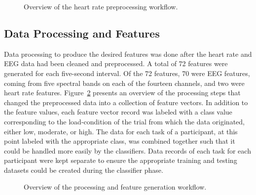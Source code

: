 \documentclass[11pt]{article}
\begin{document}
		\begin{figure}
		\centering
		\caption{Overview of the heart rate preprocessing workflow.}
		\label{fig:heart-preprocessing}
		\end{figure} 
			
	\subsection{Data Processing and Features}
	Data processing to produce the desired features was done after the heart rate and EEG data had been cleaned and preprocessed. A total of 72 features were generated for each five-second interval. Of the 72 features, 70 were EEG features, coming from five spectral bands on each of the fourteen channels, and two were heart rate features. Figure~\ref{fig:feature_generation} presents an overview of the processing steps that changed the preprocessed data into a collection of feature vectors. In addition to the feature values, each feature vector record was labeled with a class value corresponding to the load-condition of the trial from which the data originated, either low, moderate, or high. The data for each task of a participant, at this point labeled with the appropriate class, was combined together such that it could be handled more easily by the classifiers. Data records of each task for each participant were kept separate to ensure the appropriate training and testing datasets could be created during the classifier phase.

	\begin{figure}
	\centering
	\caption{Overview of the processing and feature generation workflow.}
	\label{fig:feature_generation}
	\end{figure} 
	
\end{document}
